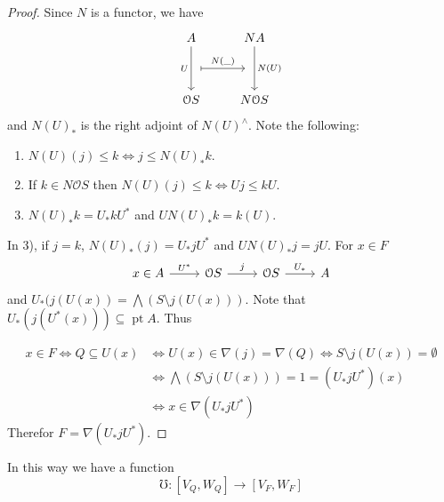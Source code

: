 \documentclass[11pt]{amsart}
\DeclareMathOperator{\pt}{pt}
\theoremstyle{plain}
\newtheorem{prop}[thm]{Proposition}
\theoremstyle{definition}
\begin{document}
\begin{proof}
Since $N$ is a functor, we have 
\[\begin{tikzcd}
	A & NA \\
	\\
	{\mathcal{O}S} & {N\mathcal{O}S}
	\arrow[""{name=0, anchor=center, inner sep=0}, "U"', from=1-1, to=3-1]
	\arrow[""{name=1, anchor=center, inner sep=0}, "{N(U)}", from=1-2, to=3-2]
	\arrow["{N(\_)}", shorten <=7pt, shorten >=7pt, maps to, from=0, to=1]
\end{tikzcd}\]
and $N(U)_*$ is the right adjoint of $N(U)^\wedge$. Note the following:
\begin{enumerate}
	\item $N(U)(j)\leq k\Leftrightarrow j\leq N(U)_*k$.
	\item If $k\in N\mathcal{O}S$ then $N(U)(j)\leq k\Leftrightarrow Uj\leq kU$.
	\item $N(U)_*k=U_*kU^*$ and $UN(U)_*k=k(U)$.
\end{enumerate}
In 3), if $j=k$, $N(U)_*(j)=U_*jU^*$ and $UN(U)_*j=jU$. For $x\in F$
\[\begin{tikzcd}
	x\in A & {\mathcal{O}S} & {\mathcal{O}S} & A
	\arrow["{U^*}", from=1-1, to=1-2]
	\arrow["j", from=1-2, to=1-3]
	\arrow["{U_*}", from=1-3, to=1-4]
\end{tikzcd}\]
and $U_*(j(U(x))=\bigwedge(S\setminus j(U(x)))$. Note that $U_*(j(U^*(x)))\subseteq \pt A$. Thus

\[
\begin{split}
x\in F \Leftrightarrow Q\subseteq U(x) &\Leftrightarrow U(x)\in \nabla(j)=\nabla(Q)\Leftrightarrow S\setminus j(U(x))=\emptyset\\
& \Leftrightarrow \bigwedge (S\setminus j(U(x)))=1=(U_*jU^*)(x)\\
&\Leftrightarrow x\in \nabla(U_*jU^*)
\end{split}
\]
Therefor $F=\nabla(U_*jU^*)$.
\end{proof}
In this way we have a function 
\[
\mho\colon [V_Q, W_Q]\to [V_F, W_F]
\]

%

\end{document}
